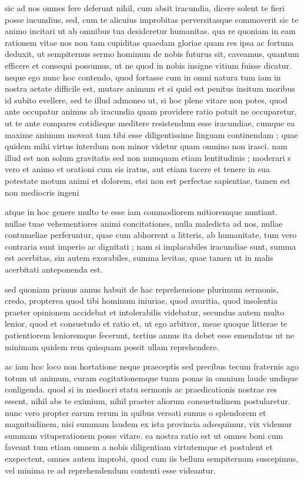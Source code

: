  sic ad nos omnes fere deferunt nihil, cum absit iracundia, dicere solent te fieri posse iucundius, sed, cum te alicuius improbitas perversitasque commoverit sic te animo incitari ut ab omnibus tua desideretur humanitas. qua re quoniam in eam rationem vitae nos non tam cupiditas quaedam gloriae quam res ipsa ac fortuna deduxit, ut sempiternus sermo hominum de nobis futurus sit, caveamus, quantum efficere et consequi possumus, ut ne quod in nobis insigne vitium fuisse dicatur. neque ego nunc hoc contendo, quod fortasse cum in omni natura tum iam in nostra aetate difficile est, mutare animum et si quid est penitus insitum moribus id subito evellere, sed te illud admoneo ut, si hoc plene vitare non potes, quod ante occupatur animus ab iracundia quam providere ratio potuit ne occuparetur, ut te ante compares cotidieque meditere resistendum esse iracundiae, cumque ea maxime animum moveat tum tibi esse diligentissime linguam continendam ; quae quidem mihi virtus interdum non minor videtur quam omnino non irasci. nam illud est non solum gravitatis sed non numquam etiam lentitudinis ; moderari s vero et animo et orationi cum sis iratus, aut etiam tacere et tenere in sua potestate motum animi et dolorem, etsi non est perfectae sapientiae, tamen est non mediocris ingeni

 atque in hoc genere multo te esse iam commodiorem mitioremque nuntiant. nullae tuae vehementiores animi concitationes, nulla maledicta ad nos, nullae contumeliae perferuntur, quae cum abhorrent a litteris, ab humanitate, tum vero contraria sunt imperio ac dignitati ; nam si implacabiles iracundiae sunt, summa est acerbitas, sin autem exorabiles, summa levitas, quae tamen ut in malis acerbitati anteponenda est.

 sed quoniam primus annus habuit de hac reprehensione plurimum sermonis, credo, propterea quod tibi hominum iniuriae, quod avaritia, quod insolentia praeter opinionem accidebat et intolerabilis videbatur, secundus autem multo lenior, quod et consuetudo et ratio et, ut ego arbitror, meae quoque litterae te patientiorem lenioremque fecerunt, tertius annus ita debet esse emendatus ut ne minimam quidem rem quisquam possit ullam reprehendere.

 ac iam hoc loco non hortatione neque praeceptis sed precibus tecum fraternis ago totum ut animum, curam cogitationemque tuam ponas in omnium laude undique conligenda. quod si in mediocri statu sermonis ac praedicationis nostrae res essent, nihil abs te eximium, nihil praeter aliorum consuetudinem postularetur. nunc vero propter earum rerum in quibus versati sumus o splendorem et magnitudinem, nisi summam laudem ex ista provincia adsequimur, vix videmur summam vituperationem posse vitare. ea nostra ratio est ut omnes boni cum faveant tum etiam omnem a nobis diligentiam virtutemque et postulent et exspectent, omnes autem improbi, quod cum iis bellum sempiternum suscepimus, vel minima re ad reprehendendum contenti esse videantur.

